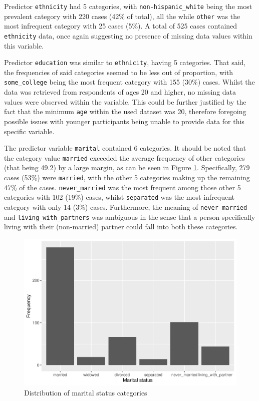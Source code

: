 \documentclass[
]{article}
\begin{document}
Predictor \texttt{ethnicity} had 5 categories, with \texttt{non-hispanic\_white} being the most prevalent category with 220 cases (42\% of total), all the while \texttt{other} was the most infrequent category with 25 cases (5\%). A total of 525 cases contained \texttt{ethnicity} data, once again suggesting no presence of missing data values within this variable.

Predictor \texttt{education} was similar to \texttt{ethnicity}, having 5 categories. That said, the frequencies of said categories seemed to be less out of proportion, with \texttt{some\_college} being the most frequent category with 155 (30\%) cases. Whilst the data was retrieved from respondents of ages 20 and higher, no missing data values were observed within the variable. This could be further justified by the fact that the minimum \texttt{age} within the used dataset was 20, therefore foregoing possible issues with younger participants being unable to provide data for this specific variable.

The predictor variable \texttt{marital} contained 6 categories. It should be noted that the category value \texttt{married} exceeded the average frequency of other categories (that being 49.2) by a large margin, as can be seen in Figure \ref{fig:marital-dist-1}. Specifically, 279 cases (53\%) were \texttt{married}, with the other 5 categories making up the remaining 47\% of the cases. \texttt{never\_married} was the most frequent among those other 5 categories with 102 (19\%) cases, whilst \texttt{separated} was the most infrequent category with only 14 (3\%) cases. Furthermore, the meaning of \texttt{never\_married} and \texttt{living\_with\_partners} was ambiguous in the sense that a person specifically living with their (non-married) partner could fall into both these categories.

\begin{figure}
\centering
\includegraphics{report_files/figure-latex/marital-dist-1-1.pdf}
\caption{\label{fig:marital-dist-1}Distribution of marital status categories}
\end{figure}
\end{document}
